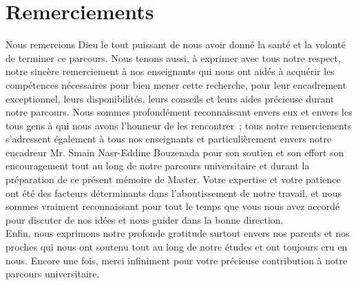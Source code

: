 \chapter*{Remerciements}

Nous remercions Dieu le tout puissant de nous avoir donné la santé et la volonté de terminer ce parcours. Nous tenons aussi, à exprimer avec tous notre respect, notre sincère remerciement à nos enseignants qui nous ont aidés à acquérir les compétences nécessaires pour bien mener cette recherche,  pour leur encadrement exceptionnel, leurs disponibilités, leurs conseils et leurs aides précieuse durant notre parcours. Nous sommes profondément reconnaissant envers eux et envers les tous gens à qui nous avons l’honneur de les rencontrer ; tous notre remerciements s’adressent également à tous nos enseignants et particulièrement envers notre encadreur Mr. Smain Nasr-Eddine Bouzenada pour son soutien et son effort son encouragement tout au long de notre parcours universitaire et durant la préparation de ce présent mémoire de Master. Votre expertise et votre patience ont été des facteurs déterminants dans l’aboutissement
de notre travail, et nous sommes vraiment reconnaissant pour tout le temps que vous nous avez accordé pour discuter de nos idées et nous guider dans la bonne direction.
\\
Enfin, nous exprimons notre profonde gratitude surtout envers nos parents et nos proches qui nous ont soutenu tout au long de notre études et ont toujours cru en nous. Encore une fois, merci infiniment pour votre précieuse contribution à notre parcours universitaire.


